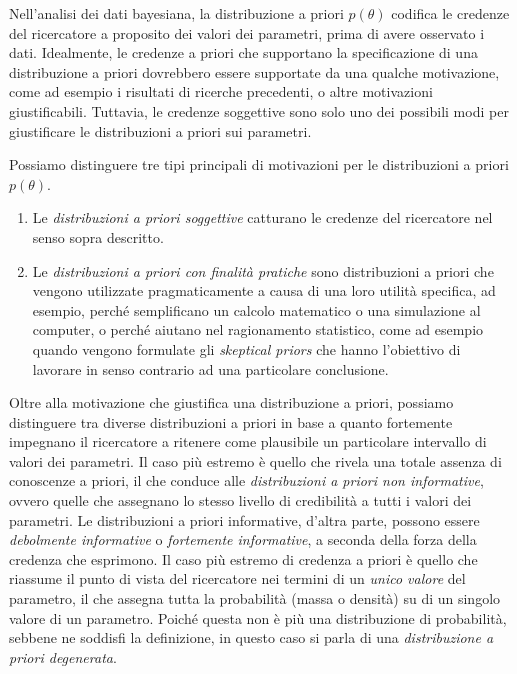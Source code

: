 \documentclass[
]{memoir}
\providecommand{\tightlist}{%
  \setlength{\itemsep}{0pt}\setlength{\parskip}{0pt}}
\theoremstyle{definition}
\theoremstyle{definition}
\theoremstyle{definition}
\theoremstyle{definition}
\theoremstyle{remark}
\begin{document}
Nell'analisi dei dati bayesiana, la distribuzione a priori \(p(\theta)\) codifica le credenze del ricercatore a proposito dei valori dei parametri, prima di avere osservato i dati. Idealmente, le credenze a priori che supportano la specificazione di una distribuzione a priori dovrebbero essere supportate da una qualche motivazione, come ad esempio i risultati di ricerche precedenti, o altre motivazioni giustificabili. Tuttavia, le credenze soggettive sono solo uno dei possibili modi per giustificare le distribuzioni a priori sui parametri.

Possiamo distinguere tre tipi principali di motivazioni per le distribuzioni a priori \(p(\theta)\).

\begin{enumerate}
\def\labelenumi{\arabic{enumi}.}
\tightlist
\item
  Le \emph{distribuzioni a priori soggettive} catturano le credenze del ricercatore nel senso sopra descritto.
\item
  Le \emph{distribuzioni a priori con finalità pratiche} sono distribuzioni a priori che vengono utilizzate pragmaticamente a causa di una loro utilità specifica, ad esempio, perché semplificano un calcolo matematico o una simulazione al computer, o perché aiutano nel ragionamento statistico, come ad esempio quando vengono formulate gli \emph{skeptical priors} che hanno l'obiettivo di lavorare in senso contrario ad una particolare conclusione.
\end{enumerate}

Oltre alla motivazione che giustifica una distribuzione a priori, possiamo distinguere tra diverse distribuzioni a priori in base a quanto fortemente impegnano il ricercatore a ritenere come plausibile un particolare intervallo di valori dei parametri. Il caso più estremo è quello che rivela una totale assenza di conoscenze a priori, il che conduce alle \emph{distribuzioni a priori non informative}, ovvero quelle che assegnano lo stesso livello di credibilità a tutti i valori dei parametri. Le distribuzioni a priori informative, d'altra parte, possono essere \emph{debolmente informative} o \emph{fortemente informative}, a seconda della forza della credenza che esprimono. Il caso più estremo di credenza a priori è quello che riassume il punto di vista del ricercatore nei termini di un \emph{unico valore} del parametro, il che assegna tutta la probabilità (massa o densità) su di un singolo valore di un parametro. Poiché questa non è più una distribuzione di probabilità, sebbene ne soddisfi la definizione, in questo caso si parla di una \emph{distribuzione a priori degenerata}.
\end{document}
